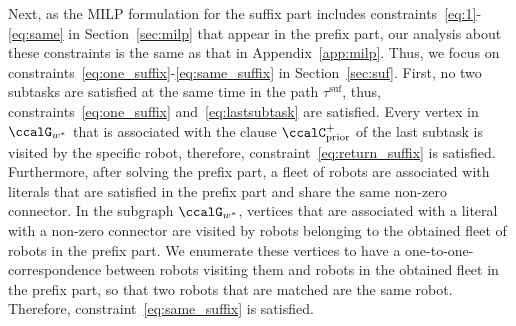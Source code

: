 \documentclass[Afour,sageh,times]{sagej}
\begin{document}
{{Next, as the MILP formulation for the suffix part includes constraints~\eqref{eq:1}-\eqref{eq:same} in Section~\ref{sec:milp} that appear in the prefix part, our analysis about these constraints is the same as that in Appendix~\ref{app:milp}. Thus, we focus on constraints~\eqref{eq:one_suffix}-\eqref{eq:same_suffix} in Section~\ref{sec:suf}. First, no two subtasks are satisfied at the same time in the path $\tau^{\text{suf}}$, thus, constraints~\eqref{eq:one_suffix} and~\eqref{eq:lastsubtask} are  satisfied. Every vertex in $\ccalG_{w^*}$ that is associated with the clause $\ccalC_{\text{prior}}^+$ of the last subtask is visited by the specific  robot, therefore, constraint~\eqref{eq:return_suffix} is satisfied. %
Furthermore, after solving  the prefix part, a fleet of robots are associated with literals that are  satisfied in the prefix part and share the same non-zero connector. In the subgraph $\ccalG_{w^*}$,  vertices  that are associated with a literal with a non-zero connector are visited by  robots belonging to the obtained fleet of robots in the prefix part. We enumerate these vertices to  have a one-to-one-correspondence between robots visiting them and robots in the obtained fleet in the prefix part, so that  two  robots that are matched  are the same robot. Therefore, constraint~\eqref{eq:same_suffix} is satisfied.

}}
\end{document}
